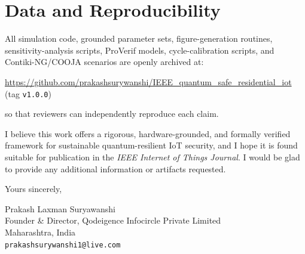 \documentclass[11pt]{article}
\begin{document}
\section*{Data and Reproducibility}
All simulation code, grounded parameter sets, figure-generation routines,
sensitivity-analysis scripts, ProVerif models, cycle-calibration scripts, and
Contiki-NG/COOJA scenarios are openly archived at:
\begin{center}
\url{https://github.com/prakashsurywanshi/IEEE_quantum_safe_residential_iot}\\
(tag \texttt{v1.0.0})
\end{center}
so that reviewers can independently reproduce each claim.

I believe this work offers a rigorous, hardware-grounded, and formally verified
framework for sustainable quantum-resilient IoT security, and I hope it is found
suitable for publication in the \emph{IEEE Internet of Things Journal}. I would be
glad to provide any additional information or artifacts requested.

\vspace{0.5em}
Yours sincerely,

\vspace{1.2em}
Prakash Laxman Suryawanshi\\
Founder \& Director, Qodeigence Infocircle Private Limited\\
Maharashtra, India\\
\texttt{prakashsurywanshi1@live.com}
\end{document}
